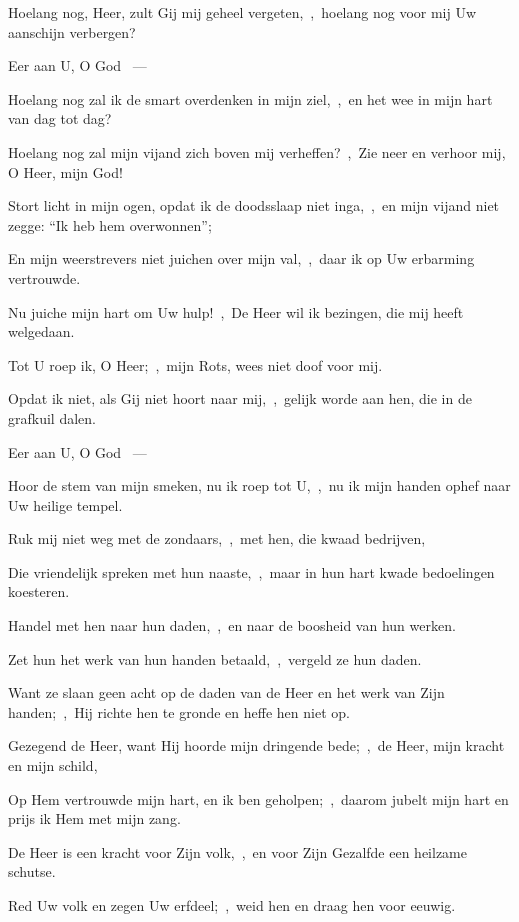 \documentclass[12pt,twoside,a5paper]{article}
\begin{document}


\begin{halfparskip}
   

  Hoelang nog, Heer, zult Gij mij geheel vergeten,~\sep\ hoelang nog voor mij Uw aanschijn verbergen?

  Eer aan U, O God ~---  

  Hoelang nog zal ik de smart overdenken in mijn ziel,~\sep\ en het wee in mijn hart van dag tot dag?

  Hoelang nog zal mijn vijand zich boven mij verheffen?~\sep\ Zie neer en verhoor mij, O Heer, mijn God!

  Stort licht in mijn ogen, opdat ik de doodsslaap niet inga,~\sep\ en mijn vijand niet zegge: ``Ik heb hem overwonnen'';

  En mijn weerstrevers niet juichen over mijn val,~\sep\ daar ik op Uw erbarming vertrouwde.

  Nu juiche mijn hart om Uw hulp!~\sep\ De Heer wil ik bezingen, die mij heeft welgedaan.
\end{halfparskip}

\begin{halfparskip}
   

  Tot U roep ik, O Heer;~\sep\ mijn Rots, wees niet doof voor mij.

  Opdat ik niet, als Gij niet hoort naar mij,~\sep\ gelijk worde aan hen, die in de grafkuil dalen.

  Eer aan U, O God ~---  

  Hoor de stem van mijn smeken, nu ik roep tot U,~\sep\ nu ik mijn handen ophef naar Uw heilige tempel.

  Ruk mij niet weg met de zondaars,~\sep\ met hen, die kwaad bedrijven,

  Die vriendelijk spreken met hun naaste,~\sep\ maar in hun hart kwade bedoelingen koesteren.

  Handel met hen naar hun daden,~\sep\ en naar de boosheid van hun werken.

  Zet hun het werk van hun handen betaald,~\sep\ vergeld ze hun daden.

  Want ze slaan geen acht op de daden van de Heer en het werk van Zijn handen;~\sep\ Hij richte hen te gronde en heffe hen niet op.

  Gezegend de Heer, want Hij hoorde mijn dringende bede;~\sep\ de Heer, mijn kracht en mijn schild,

  Op Hem vertrouwde mijn hart, en ik ben geholpen;~\sep\ daarom jubelt mijn hart en prijs ik Hem met mijn zang.

  De Heer is een kracht voor Zijn volk,~\sep\ en voor Zijn Gezalfde een heilzame schutse.

  Red Uw volk en zegen Uw erfdeel;~\sep\ weid hen en draag hen voor eeuwig.
\end{halfparskip}
\end{document}
